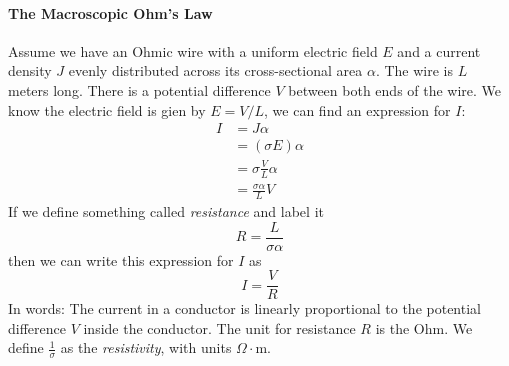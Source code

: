\documentclass[a4paper]{article}
\begin{document}
\paragraph{The Macroscopic Ohm's Law}
Assume we have an Ohmic wire with a uniform electric field $E$ and a current
density $J$ evenly distributed across its cross-sectional area $\alpha$. The
wire is $L$ meters long. There is a potential difference $V$ between both ends
of the wire. We know the electric field is gien by $E=V/L$, we can find an
expression for $I$:
\begin{align*}
	I &= J\alpha\\
	  &= (\sigma E)\alpha\\
	  &= \sigma\frac{V}{L}\alpha\\
	  &= \frac{\sigma \alpha}{L} V
\end{align*}
If we define something called \emph{resistance} and label it
\[ R = \frac{L}{\sigma \alpha} \]
then we can write this expression for $I$ as
\[ I = \frac{V}{R} \]
In words: The current in a conductor is linearly proportional to the potential
difference $V$ inside the conductor. The unit for resistance $R$ is the
Ohm. We define $\frac{1}{\sigma}$ as the \emph{resistivity}, with units
$\Omega\cdot$m.
\end{document}
